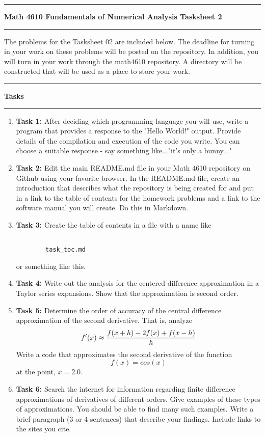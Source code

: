 \documentclass[10pt,fleqn]{article}
\begin{document}
\vskip0.1in\hrule\vskip0.1in \noindent
{\bf{\Large Math 4610 Fundamentals of Numerical Analysis Tasksheet 2}}
\vskip0.1in\hrule\vskip0.1in \noindent
The problems for the Tasksheet 02 are included below. The deadline for turning
in your work on these problems will be posted on the repository. In addition,
you will turn in your work through the math4610 repository. A directory will be
constructed that will be used as a place to store your work.
\vskip0.1in\hrule\vskip0.1in \noindent
{\bf{\large Tasks}}
\vskip0.1in\hrule\vskip0.1in \noindent
\begin{enumerate}
\item {\bf Task 1:} After deciding which programming language you will use,
      write a program that provides a response to the "Hello World!" output.
      Provide details of the compilation and execution of the code you write.
      You can choose a suitable response - say something like..."it's only a
      bunny..."
\item {\bf Task 2:} Edit the main README.md file in your Math 4610 repository on
      Github using your favorite browser. In the README.md file, create an
      introduction that describes what the repository is being created for and
      put in a link to the table of contents for the homework problems and a
      link to the software manual you will create. Do this in Markdown.
\item {\bf Task 3:} Create the table of contents in a file with a name like
      \begin{verbatim}

        task_toc.md

      \end{verbatim}
      or something like this.
\item {\bf Task 4:} Write out the analysis for the centered difference
      approximation in a Taylor series expansions. Show that the approximation
      is second order.
\item {\bf Task 5:} Determine the order of accuracy of the central difference
      approximation of the second derivative. That is, analyze
      \[
        f'(x) \approx {{f(x+h) - 2 f(x) + f(x-h)}\over{h}}
      \]
      Write a code that approximates the second derivative of the function
      \[
        f(x) = cos(x)
      \] 
      at the point, \(x=2.0\).
\item {\bf Task 6:} Search the internet for information regarding finite
      difference approximations of derivatives of different orders. Give
      examples of these types of approximations. You should be able to find many
      such examples. Write a brief paragraph (3 or 4 sentences) that describe
      your findings. Include links to the sites you cite.
\end{enumerate}
\end{document}
